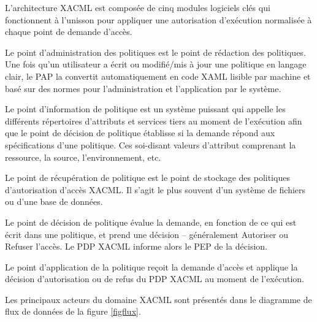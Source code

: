 \label{sectionArchitectureXACML}

L'architecture XACML est composée de cinq modules logiciels clés qui fonctionnent à l'unisson pour appliquer une autorisation d'exécution normalisée à chaque point de demande d'accès.

\label{sectionArchitectureXACMLPAP}

Le point d'administration des politiques est le point de rédaction des politiques. Une fois qu'un utilisateur a écrit ou modifié/mis à jour une politique en langage clair, le PAP la convertit automatiquement en code XAML lisible par machine et basé sur des normes pour l'administration et l'application par le système.

\label{sectionArchitectureXACMLPIP}

Le point d'information de politique est un système puissant qui appelle les différents répertoires d'attributs et services tiers au moment de l'exécution afin que le point de décision de politique établisse si la demande répond aux spécifications d'une politique. Ces soi-disant valeurs d'attribut comprenant la ressource, la source, l'environnement, etc.

\label{sectionArchitectureXACMLPRP}

Le point de récupération de politique est le point de stockage des politiques d'autorisation d'accès XACML. Il s'agit le plus souvent d'un système de fichiers ou d'une base de données.

\label{sectionArchitectureXACMLPDP}

Le point de décision de politique évalue la demande, en fonction de ce qui est écrit dans une politique, et prend une décision – généralement Autoriser ou Refuser l'accès. Le PDP XACML informe alors le PEP de la décision.

\label{sectionArchitectureXACMLPEP}

Le point d'application de la politique reçoit la demande d'accès et applique la décision d'autorisation ou de refus du PDP XACML au moment de l'exécution.

\label{sectionFluxXACML}

Les principaux acteurs du domaine XACML sont présentés dans le diagramme de flux de données de la figure \ref{figflux}. \\

